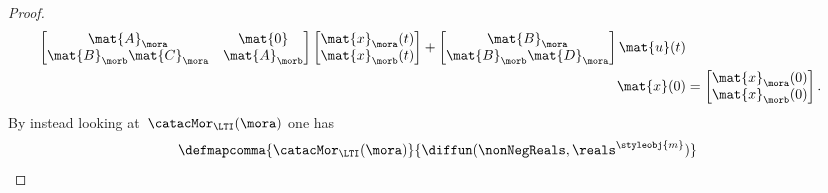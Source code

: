 \begin{proof}
\begin{equation}
\begin{aligned}
\begin{bmatrix}
                                                  \mat{A}_\mora              & \mat{0}       \\
                                                  \mat{B}_\morb\mat{C}_\mora & \mat{A}_\morb
                                              \end{bmatrix} \begin{bmatrix}
                                                                \mat{x}_\mora(t) \\
                                                                \mat{x}_\morb(t)
                                                            \end{bmatrix}+\begin{bmatrix}
                                                                              \mat{B}_\mora \\
                                                                              \mat{B}_\morb\mat{D}_\mora
                                                                          \end{bmatrix}\mat{u}(t) \\
            \mat{x}(0)                                & =
            \begin{bmatrix}
                \mat{x}_\mora(0) \\
                \mat{x}_\morb(0)\end{bmatrix}.
        \end{aligned}
    \end{equation}
    By instead looking at~$\catacMor_\LTI(\mora)$ one has
    \begin{equation*}
        \defmapcomma{\catacMor_\LTI(\mora)}
        {\diffun(\nonNegReals,\reals^\styleobj{m})}

\end{equation*}
\end{proof}
